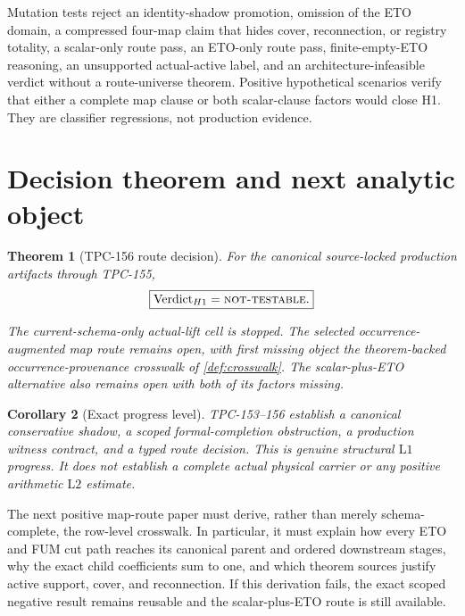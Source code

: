 \documentclass[11pt]{article}
\newtheorem{theorem}{Theorem}[section]
\newtheorem{corollary}[theorem]{Corollary}
\theoremstyle{definition}
\theoremstyle{remark}
\numberwithin{equation}{section}
\newcommand{\Lone}{\mathrm{L1}}
\newcommand{\Ltwo}{\mathrm{L2}}
\newcommand{\NT}{\textnormal{\textsc{not-testable}}}
\begin{document}
Mutation tests reject an identity-shadow promotion, omission of the
ETO domain, a compressed four-map claim that hides cover,
reconnection, or registry totality, a scalar-only route pass, an
ETO-only route pass, finite-empty-ETO reasoning, an unsupported
actual-active label, and an architecture-infeasible verdict without
a route-universe theorem.  Positive hypothetical scenarios verify
that either a complete map clause or both scalar-clause factors would
close H1.  They are classifier regressions, not production evidence.

\clearpage
\section{Decision theorem and next analytic object}

\begin{theorem}[TPC-156 route decision]
\label{thm:decision}
For the canonical source-locked production artifacts through
TPC-155,
\[
 \boxed{\operatorname{Verdict}_{H1}=\NT.}
\]
\par\noindent
The current-schema-only actual-lift cell is stopped.  The selected
occurrence-augmented map route remains open, with first missing object
the theorem-backed occurrence-provenance crosswalk of
\cref{def:crosswalk}.  The scalar-plus-ETO alternative also remains
open with both of its factors missing.
\end{theorem}

\begin{corollary}[Exact progress level]
TPC-153--156 establish a canonical conservative shadow, a scoped
formal-completion obstruction, a production witness contract, and a
typed route decision.  This is genuine structural \(\Lone\) progress.
It does not establish a complete actual physical carrier or any
positive arithmetic \(\Ltwo\) estimate.
\end{corollary}

The next positive map-route paper must derive, rather than merely
schema-complete, the row-level crosswalk.  In particular, it must
explain how every ETO and FUM cut path reaches its canonical parent
and ordered downstream stages, why the exact child coefficients sum
to one, and which theorem sources justify active support, cover, and
reconnection.  If this derivation fails, the exact scoped negative
result remains reusable and the scalar-plus-ETO route is still
available.

\begingroup
\small
\raggedright


\endgroup
\end{document}
